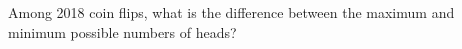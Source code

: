 Among 2018 coin flips, what is the difference between the maximum and minimum possible numbers of heads?
